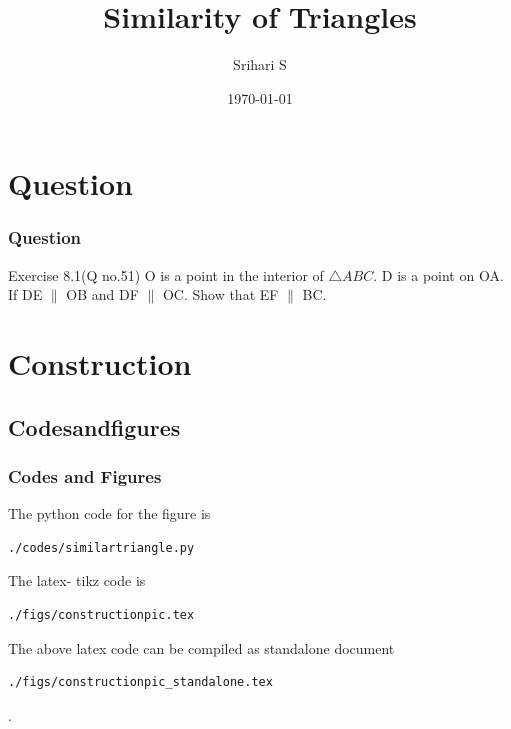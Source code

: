 \documentclass{beamer}
\title{Similarity of Triangles}
\author{Srihari S}
\institute{College of Engineering - Guindy}
\date{\today}
\begin{document}
\begin{frame}
\titlepage
\end{frame}
\section{Question}
\begin{frame}
\frametitle{Question}
\begin{block}{Exercise 8.1(Q no.51)}
O is a point in the interior of $\triangle ABC$. D is a point on OA. If DE $\parallel$ OB and DF $\parallel$ OC. Show that EF $\parallel$ BC.
\end{block}
\end{frame}

\section{\textbf{Construction}}
\subsection*{Codesandfigures}
\begin{frame}[fragile]
\frametitle{Codes and Figures}
\tiny
\begin{flushleft}
The python code for the figure is
\begin{lstlisting}
./codes/similartriangle.py
\end{lstlisting}
The latex- tikz code is
\begin{lstlisting}
./figs/constructionpic.tex
\end{lstlisting}
The above latex code can be compiled as standalone document
\begin{lstlisting} 
./figs/constructionpic_standalone.tex
\end{lstlisting}
\end{flushleft}.

\end{frame}
\end{document}
